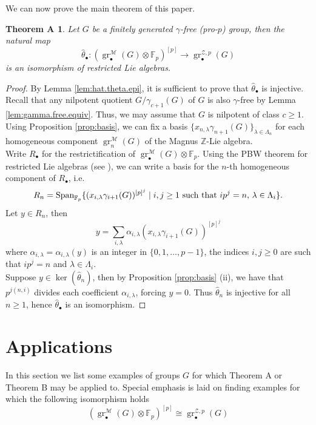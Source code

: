 \documentclass{amsart}
\theoremstyle{plain}
\newtheorem*{thmA}{Theorem A}
\theoremstyle{definition}
\numberwithin{theorem}{section}
\numberwithin{equation}{section}
\newcommand{\grM}{\operatorname{gr}^{\mathscr M}}
\newcommand{\grZ}{\operatorname{gr}^{{\mathcal Z}, p}}
\newcommand{\FF}{\mathbb{F}}
\newcommand{\Z}{\mathbb Z}
\begin{document}
\noindent
We can now prove the main theorem of this paper.
\begin{thmA}\label{th:hat.theta.iso}
	Let $G$ be a finitely generated $\gamma$-free (pro-$p$) group, then the natural map
\[
	\hat\theta_\bullet : (\grM_\bullet(G) \otimes \FF_p)^{[p]} \to \grZ_\bullet(G)
\]
	is an isomorphism of restricted Lie algebras.
\end{thmA} 
\begin{proof}
	By Lemma \ref{lem:hat.theta.epi}, it is sufficient to prove that $\hat\theta_\bullet$ is injective.
    Recall that any nilpotent quotient $G/\gamma_{c+1}(G)$ of $G$ is also $\gamma$-free by Lemma \ref{lem:gamma.free.equiv}. Thus, we may assume that $G$ is nilpotent of class $c \geq 1$. Using Proposition \ref{prop:basis}, we can fix a basis $\{x_{n, \lambda} \gamma_{n+1}(G)\}_{\lambda \in \Lambda_n}$ for each homogeneous component $\grM_n(G)$ of the Magnus $\Z$-Lie algebra. \\
	Write $R_\bullet$ for the restrictification of $\grM_\bullet(G) \otimes \FF_p$. Using the PBW theorem for restricted Lie algebras (see \cite{Jac41}), we can write a basis for the $n$-th homogeneous component of $R_\bullet$, i.e.
	\[
		R_n = {\rm Span}_{\FF_p}\{ (x_{i, \lambda} \gamma_{i+1}(G))^{[p]^j} \mid i, j \geq 1 \text{ such that } ip^j = n, \, \lambda \in \Lambda_i \}.
	\]
	Let $y \in R_n$, then 
	\[
		y = \sum_{i, \lambda} \alpha_{i, \lambda} (x_{i, \lambda}\gamma_{i+1}(G))^{[p]^j}
	\]
	where $\alpha_{i, \lambda} = \alpha_{i, \lambda}(y)$ is an integer in $\{0, 1, \dots, p-1\}$, the indices $i, j \geq 0$ are such that $ip^j = n$ and $\lambda \in \Lambda_i$.\\
	Suppose $y \in \ker(\hat\theta_n)$, then by Proposition \ref{prop:basis} (ii), we have that $p^{j(n, i)}$ divides each coefficient $\alpha_{i, \lambda}$, forcing $y = 0$. Thus $\hat\theta_n$ is injective for all $n \geq 1$, hence $\hat\theta_\bullet$ is an isomorphism.
\end{proof}



\section{Applications}

In this section we list some examples of groups $G$ for which Theorem A or Theorem B may be applied to. Special emphasis is laid on finding examples for which the following isomorphism holds
\[
	(\grM_\bullet(G) \otimes \FF_p)^{[p]} \cong \grZ_\bullet(G)
\] 
\end{document}
